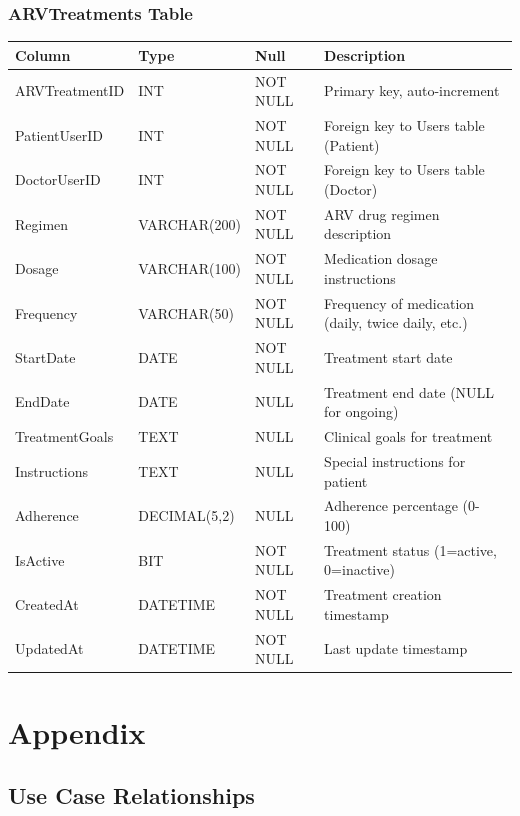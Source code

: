 \documentclass[12pt,a4paper]{article}
\begin{document}
\subsubsection{ARVTreatments Table}
\begin{longtable}{|p{3cm}|p{2cm}|p{2cm}|p{7cm}|}
\hline
\textbf{Column} & \textbf{Type} & \textbf{Null} & \textbf{Description} \\
\hline
ARVTreatmentID & INT & NOT NULL & Primary key, auto-increment \\
\hline
PatientUserID & INT & NOT NULL & Foreign key to Users table (Patient) \\
\hline
DoctorUserID & INT & NOT NULL & Foreign key to Users table (Doctor) \\
\hline
Regimen & VARCHAR(200) & NOT NULL & ARV drug regimen description \\
\hline
Dosage & VARCHAR(100) & NOT NULL & Medication dosage instructions \\
\hline
Frequency & VARCHAR(50) & NOT NULL & Frequency of medication (daily, twice daily, etc.) \\
\hline
StartDate & DATE & NOT NULL & Treatment start date \\
\hline
EndDate & DATE & NULL & Treatment end date (NULL for ongoing) \\
\hline
TreatmentGoals & TEXT & NULL & Clinical goals for treatment \\
\hline
Instructions & TEXT & NULL & Special instructions for patient \\
\hline
Adherence & DECIMAL(5,2) & NULL & Adherence percentage (0-100) \\
\hline
IsActive & BIT & NOT NULL & Treatment status (1=active, 0=inactive) \\
\hline
CreatedAt & DATETIME & NOT NULL & Treatment creation timestamp \\
\hline
UpdatedAt & DATETIME & NOT NULL & Last update timestamp \\
\hline
\end{longtable}

\newpage

\section{Appendix}

\subsection{Use Case Relationships}
\end{document}
